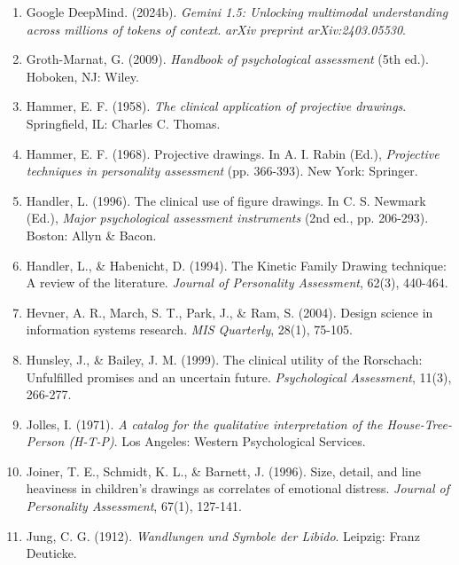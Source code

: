 \begin{enumerate}
\item Google DeepMind. (2024b). \textit{Gemini 1.5: Unlocking multimodal understanding across millions of tokens of context}. \textit{arXiv preprint arXiv:2403.05530}.

\item Groth-Marnat, G. (2009). \textit{Handbook of psychological assessment} (5th ed.). Hoboken, NJ: Wiley.

\item Hammer, E. F. (1958). \textit{The clinical application of projective drawings}. Springfield, IL: Charles C. Thomas.

\item Hammer, E. F. (1968). Projective drawings. In A. I. Rabin (Ed.), \textit{Projective techniques in personality assessment} (pp. 366-393). New York: Springer.

\item Handler, L. (1996). The clinical use of figure drawings. In C. S. Newmark (Ed.), \textit{Major psychological assessment instruments} (2nd ed., pp. 206-293). Boston: Allyn \& Bacon.

\item Handler, L., \& Habenicht, D. (1994). The Kinetic Family Drawing technique: A review of the literature. \textit{Journal of Personality Assessment}, 62(3), 440-464.

\item Hevner, A. R., March, S. T., Park, J., \& Ram, S. (2004). Design science in information systems research. \textit{MIS Quarterly}, 28(1), 75-105.

\item Hunsley, J., \& Bailey, J. M. (1999). The clinical utility of the Rorschach: Unfulfilled promises and an uncertain future. \textit{Psychological Assessment}, 11(3), 266-277.

\item Jolles, I. (1971). \textit{A catalog for the qualitative interpretation of the House-Tree-Person (H-T-P)}. Los Angeles: Western Psychological Services.

\item Joiner, T. E., Schmidt, K. L., \& Barnett, J. (1996). Size, detail, and line heaviness in children's drawings as correlates of emotional distress. \textit{Journal of Personality Assessment}, 67(1), 127-141.

\item Jung, C. G. (1912). \textit{Wandlungen und Symbole der Libido}. Leipzig: Franz Deuticke.


\end{enumerate}
